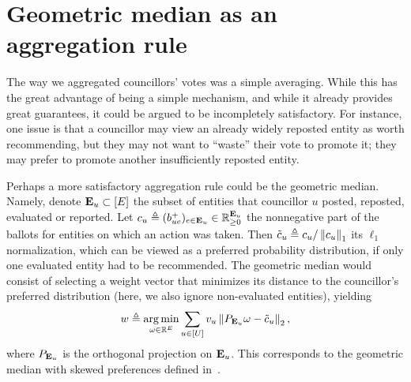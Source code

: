 \section{Geometric median as an aggregation rule}
\label{app:geometric-median}

The way we aggregated councillors' votes was a simple averaging.
While this has the great advantage of being a simple mechanism,
and while it already provides great guarantees,
it could be argued to be incompletely satisfactory.
For instance, one issue is that a councillor may view 
an already widely reposted entity as worth recommending,
but they may not want to ``waste'' their vote to promote it;
they may prefer to promote another insufficiently reposted entity.

Perhaps a more satisfactory aggregation rule could be the geometric median.
Namely, denote ${\bf E}_u \subset [E]$ the subset of entities 
that councillor $u$ posted, reposted, evaluated or reported.
Let $c_u \triangleq (b_{ue}^+)_{e \in {\bf E}_u} \in \mathbb R_{\geq 0}^{{\bf E}_u}$ 
the nonnegative part of the ballots 
for entities on which an action was taken.
Then $\tilde c_u \triangleq c_u / \left\lVert{c_u}\right\rVert_{1}$ its $\ell_1$ normalization,
which can be viewed as a preferred probability distribution,
if only one evaluated entity had to be recommended.
The geometric median would consist of selecting a weight vector that minimizes its distance 
to the councillor's preferred distribution (here, we also ignore non-evaluated entities), yielding
\begin{align}
    w \triangleq \operatorname*{arg\,min}_{\omega \in \mathbb R^E} 
        \sum_{u \in [U]} v_u \left\lVert{ P_{{\bf E}_u} \omega - \tilde c_u }\right\rVert_{2},
\end{align}
where $P_{{\bf E}_u}$ is the orthogonal projection on ${\bf E}_u$.
This corresponds to the geometric median 
with skewed preferences defined in~\cite{DBLP:conf/aistats/El-MhamdiFGH23}.

